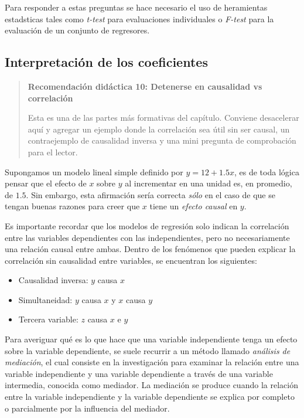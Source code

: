 \documentclass[
]{book}
\providecommand{\tightlist}{%
  \setlength{\itemsep}{0pt}\setlength{\parskip}{0pt}}
\begin{document}
Para responder a estas preguntas se hace necesario el uso de heramientas
estadsticas tales como \emph{t-test} para evaluaciones individuales o
\emph{F-test} para la evaluación de un conjunto de regresores.

\hypertarget{interpretaciuxf3n-de-los-coeficientes-1}{%
\subsection{Interpretación de los coeficientes}\label{interpretaciuxf3n-de-los-coeficientes-1}}

\begin{quote}
\textbf{Recomendación didáctica 10: Detenerse en causalidad vs correlación}

Esta es una de las partes más formativas del capítulo. Conviene
desacelerar aquí y agregar un ejemplo donde la correlación sea útil
sin ser causal, un contraejemplo de causalidad inversa y una mini
pregunta de comprobación para el lector.
\end{quote}

Supongamos un modelo lineal simple definido por \(y = 12 + 1.5x\), es de
toda lógica pensar que el efecto de \(x\) sobre \(y\) al incrementar en una
unidad es, en promedio, de \(1.5\). Sin embargo, esta afirmación sería
correcta \emph{sólo} en el caso de que se tengan buenas razones para creer
que \(x\) tiene un \emph{efecto causal} en \(y\).

Es importante recordar que los modelos de regresión solo indican la
correlación entre las variables dependientes con las independientes,
pero no necesariamente una relación causal entre ambas. Dentro de los
fenómenos que pueden explicar la correlación sin causalidad entre
variables, se encuentran los siguientes:

\begin{itemize}
\tightlist
\item
  Causalidad inversa: \(y\) causa \(x\)
\item
  Simultaneidad: \(y\) causa \(x\) y \(x\) causa \(y\)
\item
  Tercera variable: \(z\) causa \(x\) e \(y\)
\end{itemize}

Para averiguar qué es lo que hace que una variable independiente tenga
un efecto sobre la variable dependiente, se suele recurrir a un método
llamado \emph{análisis de mediación}, el cual consiste en la investigación
para examinar la relación entre una variable independiente y una
variable dependiente a través de una variable intermedia, conocida como
mediador. La mediación se produce cuando la relación entre la variable
independiente y la variable dependiente se explica por completo o
parcialmente por la influencia del mediador.
\end{document}

